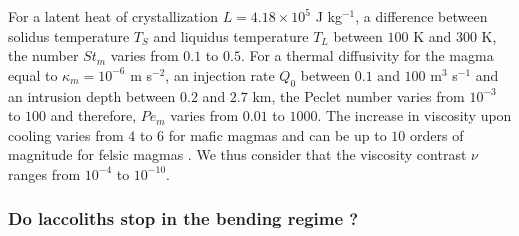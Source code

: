 For a latent heat of crystallization $L = 4.18\times10^5$ J kg$^{-1}$,
a   difference  between   solidus  temperature   $T_S$  and   liquidus
temperature  $T_L$ between  $100$ K  and  $300$ K,  the number  $St_m$
varies from $0.1$  to $0.5$.  For a thermal diffusivity  for the magma
equal  to $\kappa_m=  10^{-6}$  m s$^{-2}$,  an  injection rate  $Q_0$
between $0.1$ and $100$ m$^3$  s$^{-1}$ and an intrusion depth between
$0.2$ and $2.7$  km, the Peclet number varies from  $10^{-3}$ to $100$
and therefore,  $Pe_m$ varies from  $0.01$ to $1000$. The  increase in
viscosity upon cooling varies from $4$ to $6$ for mafic magmas and can
be   up   to   $10$   orders    of   magnitude   for   felsic   magmas
\citep{Anonymous:CZVBrBvv,Lejeune:1995fc,Giordano:2008em,Diniega:2013eh}.
We  thus  consider  that  the viscosity  contrast  $\nu$  ranges  from
$10^{-4}$ to $10^{-10}$.

\subsubsection*{Do laccoliths stop in the bending regime ?}
\label{C4-sec:range-valu-dimens}

